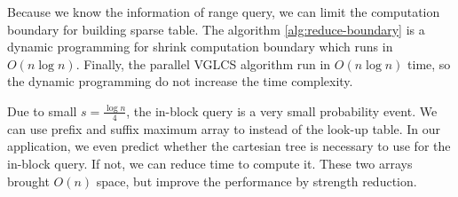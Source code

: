 \iffalse
運行區間查找時，一般依賴內建函數在 $O(1)$ 時間完成對數取整，
然而，在 VGLCS 這類型的動態規劃中，區間查找的對數結果是可以被預測的，預先將每一組詢問的區段對數結果儲存在陣列中，便可降低指令次數。
\fi

Because we know the information of range query, we can limit the
computation boundary for building sparse table.  The algorithm
\ref{alg:reduce-boundary} is a dynamic programming for shrink
computation boundary which runs in $O(n \log n)$.  Finally, the
parallel VGLCS algorithm run in $O(n \log n)$ time, so the dynamic
programming do not increase the time complexity.

\iffalse
由於已知所有詢問區間，建立稀疏表時，可藉由動態規劃在 $O(n \log n)$ 排除掉不可能的計算 (參照算法 ~\ref{alg:reduce-boundary})，
降低過程中的計算量。由於 VGLCS 在平行操作需要 $O(n \log n)$，故使用動態規劃不影響我們的最終結果。
\fi



Due to small $s = \frac{\log n}{4}$, the in-block query is a very
small probability event.  We can use prefix and suffix maximum array
to instead of the look-up table.  In our application, we even predict
whether the cartesian tree is necessary to use for the in-block query.
If not, we can reduce time to compute it.  These two arrays brought
$O(n)$ space, but improve the performance by strength reduction.

\iffalse
從機率分佈的角度來看，因 $s = \frac{1}{4} \log n$ 過小，區間詢問完全落於 block 的機率低，
故額外維護區段前綴和後綴最大值 (prefix/suffix maximum value in block) 取代笛卡爾樹的建立。
藉這兩個額外儲存空間，將會增加空間複雜度的常數，卻能有效地降低整體的指令次數。
\fi
